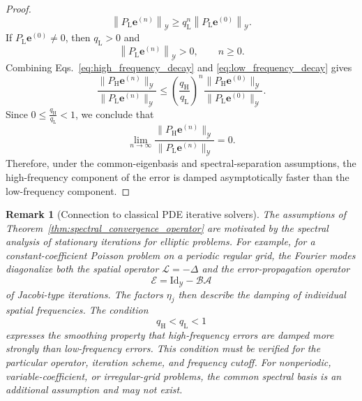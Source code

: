 \documentclass[preprint,numbers,sort&compress]{elsarticle}
\newtheorem{remark}{Remark}
\begin{document}
\begin{proof}
\begin{equation}
					\left\|
					P_{\mathrm L}\boldsymbol e^{(n)}
					\right\|_{\mathcal Y}
					\geq
					q_{\mathrm L}^n
					\left\|
					P_{\mathrm L}\boldsymbol e^{(0)}
					\right\|_{\mathcal Y}.
					\label{eq:low_frequency_decay}
				\end{equation}
				If
				$P_{\mathrm L}\boldsymbol e^{(0)}\neq0$, then
				$q_{\mathrm L}>0$ and
				\[
				\left\|
				P_{\mathrm L}\boldsymbol e^{(n)}
				\right\|_{\mathcal Y}
				>0,
				\qquad n\geq0.
				\]
				Combining
				Eqs.~\eqref{eq:high_frequency_decay} and
				\eqref{eq:low_frequency_decay} gives
				\[
				\frac{
					\|P_{\mathrm H}\boldsymbol e^{(n)}\|_{\mathcal Y}
				}{
					\|P_{\mathrm L}\boldsymbol e^{(n)}\|_{\mathcal Y}
				}
				\leq
				\left(
				\frac{q_{\mathrm H}}{q_{\mathrm L}}
				\right)^n
				\frac{
					\|P_{\mathrm H}\boldsymbol e^{(0)}\|_{\mathcal Y}
				}{
					\|P_{\mathrm L}\boldsymbol e^{(0)}\|_{\mathcal Y}
				}.
				\]
				Since $0\leq
				\frac{q_{\mathrm H}}{q_{\mathrm L}}
				<1$,
				we conclude that
				\[
				\lim_{n\to\infty}
				\frac{
					\|P_{\mathrm H}\boldsymbol e^{(n)}\|_{\mathcal Y}
				}{
					\|P_{\mathrm L}\boldsymbol e^{(n)}\|_{\mathcal Y}
				}
				=0.
				\]
				Therefore, under the common-eigenbasis and spectral-separation
				assumptions, the high-frequency component of the error is damped
				asymptotically faster than the low-frequency component.
			\end{proof}
			
			\begin{remark}[Connection to classical PDE iterative solvers]
				The assumptions of Theorem~\ref{thm:spectral_convergence_operator}
				are motivated by the spectral analysis of stationary iterations for elliptic problems. For example, for a constant-coefficient Poisson problem on a periodic regular grid, the Fourier modes diagonalize both the spatial operator $\mathcal L=-\Delta$ and the error-propagation operator
				\[
				\mathcal E
				=
				\mathrm{Id}_{\mathcal Y}-\mathcal B\mathcal A
				\]
				of Jacobi-type iterations. The factors $\eta_j$ then describe the damping of individual spatial frequencies. The condition
				\[
				q_{\mathrm H}<q_{\mathrm L}<1
				\]
				expresses the smoothing property that high-frequency errors are damped more strongly than low-frequency errors. This condition must be verified for the particular operator, iteration scheme, and frequency cutoff. For nonperiodic, variable-coefficient, or irregular-grid problems, the common spectral basis is an additional assumption and may not exist.
			\end{remark}
			
\end{document}

